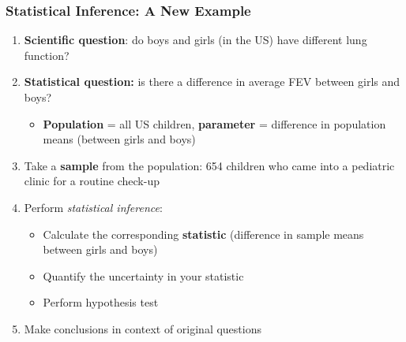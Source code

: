 \documentclass[12pt, 
hyperref={colorlinks=true, linkcolor=blue, urlcolor=cyan}]{beamer}
\begin{document}

\begin{frame}
\frametitle{Statistical Inference: A New Example}
\begin{enumerate}
\item \textbf{Scientific question}: do boys and girls (in the US) have \color{orange} different \color{blue} lung function\color{black}? \pause
\item \textbf{Statistical question:} is there a \color{orange} difference in average \color{blue} FEV \color{orange} \color{black} between girls and boys? \pause
	\begin{itemize}
	\item \textbf{Population} = all US children, \textbf{parameter} = difference in population means (between girls and boys) \pause
	\end{itemize}
\item Take a \textbf{sample} from the population: 654 children who came into a pediatric clinic for a routine check-up \pause
\item Perform \textit{statistical inference}:
	\begin{itemize}
	\item Calculate the corresponding \textbf{statistic} (difference in sample means between girls and boys)
	\item Quantify the uncertainty in your statistic 
	\item Perform hypothesis test \pause
	\end{itemize}
\item Make conclusions in context of original questions
\end{enumerate}
\end{frame}
\end{document}
